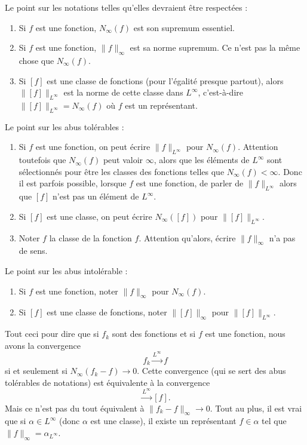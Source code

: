 \begin{normaltext}
	Le point sur les notations telles qu'elles devraient être respectées :
	\begin{enumerate}
		\item
		      Si \( f\) est une fonction, \( N_{\infty}(f)\) est son supremum essentiel.
		\item
		      Si \( f\) est une fonction, \( \| f \|_{\infty}\) est sa norme supremum. Ce n'est pas la même chose que \( N_{\infty}(f)\).
		\item
		      Si \( [f]\) est une classe de fonctions (pour l'égalité presque partout), alors \( \| [f] \|_{L^{\infty}}\) est la norme de cette classe dans \( L^{\infty}\), c'est-à-dire \( \| [f] \|_{L^{\infty}}=N_{\infty}(f)\) où \( f\) est un représentant.
	\end{enumerate}
	Le point sur les abus tolérables :
	\begin{enumerate}
		\item
		      Si \( f\) est une fonction, on peut écrire \( \| f \|_{L^{\infty}}\) pour \( N_{\infty}(f)\). Attention toutefois que \( N_{\infty}(f)\) peut valoir \( \infty\), alors que les éléments de \( L^{\infty}\) sont sélectionnés pour être les classes des fonctions telles que \( N_{\infty}(f)<\infty\). Donc il est parfois possible, lorsque \( f\) est une fonction, de parler de \( \| f \|_{L^{\infty}}\) alors que \( [f]\) n'est pas un élément de \( L^{\infty}\).
		\item
		      Si \( [f]\) est une classe, on peut écrire \( N_{\infty}([f])\) pour \( \| [f] \|_{L^{\infty}}\).
		\item
		      Noter \( f\) la classe de la fonction \( f\). Attention qu'alors, écrire \( \| f \|_{\infty}\) n'a pas de sens.
	\end{enumerate}
	Le point sur les abus intolérable :
	\begin{enumerate}
		\item
		      Si \( f\) est une fonction, noter \( \| f \|_{\infty}\) pour \( N_{\infty}(f)\).
		\item
		      Si \( [f]\) est une classe de fonctions, noter \( \| [f] \|_{\infty}\) pour \( \| [f] \|_{L^{\infty}}\).
	\end{enumerate}
\end{normaltext}

\begin{normaltext}
	Tout ceci pour dire que si \( f_k\) sont des fonctions et si \( f\) est une fonction, nous avons la convergence
	\begin{equation}
		f_k\stackrel{L^{\infty}}{\longrightarrow}f
	\end{equation}
	si et seulement si \( N_{\infty}(f_k-f)\to 0\). Cette convergence (qui se sert des abus tolérables de notations) est équivalente à la convergence
	\begin{equation}
		[f_k]\stackrel{L^{\infty}}{\longrightarrow}[f].
	\end{equation}
	Mais ce n'est pas du tout équivalent à \( \| f_k -f \|_{\infty}\to 0\). Tout au plus, il est vrai que si \( \alpha\in L^{\infty}\) (donc \( \alpha\) est une classe), il existe un représentant \( f\in \alpha\) tel que \( \| f \|_{\infty}=\alpha_{L^{\infty}}\).
\end{normaltext}

